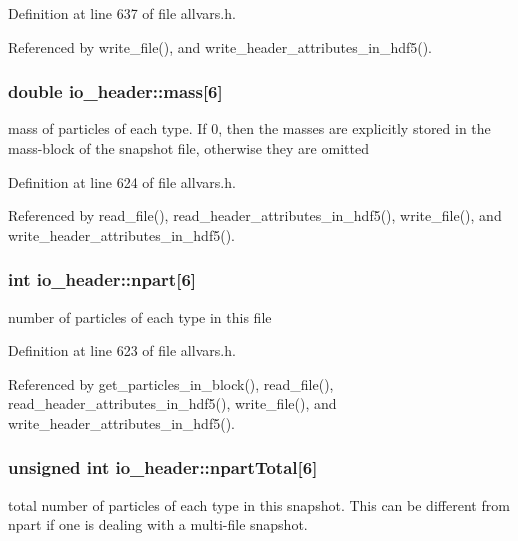 Definition at line 637 of file allvars.h.



Referenced by write\_\-file(), and write\_\-header\_\-attributes\_\-in\_\-hdf5().

\hypertarget{structio__header_a2c387b0c7c823287d424fedc70175917}{
\subsubsection[{mass}]{\setlength{\rightskip}{0pt plus 5cm}double {\bf io\_\-header::mass}\mbox{[}6\mbox{]}}}
\label{structio__header_a2c387b0c7c823287d424fedc70175917}
mass of particles of each type. If 0, then the masses are explicitly stored in the mass-\/block of the snapshot file, otherwise they are omitted 

Definition at line 624 of file allvars.h.



Referenced by read\_\-file(), read\_\-header\_\-attributes\_\-in\_\-hdf5(), write\_\-file(), and write\_\-header\_\-attributes\_\-in\_\-hdf5().

\hypertarget{structio__header_adc88d581cf3d57eb975a51f587538bdd}{
\subsubsection[{npart}]{\setlength{\rightskip}{0pt plus 5cm}int {\bf io\_\-header::npart}\mbox{[}6\mbox{]}}}
\label{structio__header_adc88d581cf3d57eb975a51f587538bdd}
number of particles of each type in this file 

Definition at line 623 of file allvars.h.



Referenced by get\_\-particles\_\-in\_\-block(), read\_\-file(), read\_\-header\_\-attributes\_\-in\_\-hdf5(), write\_\-file(), and write\_\-header\_\-attributes\_\-in\_\-hdf5().

\hypertarget{structio__header_ad63a8b413a6b56c33bf5ecc25550a6dd}{
\subsubsection[{npartTotal}]{\setlength{\rightskip}{0pt plus 5cm}unsigned int {\bf io\_\-header::npartTotal}\mbox{[}6\mbox{]}}}
\label{structio__header_ad63a8b413a6b56c33bf5ecc25550a6dd}
total number of particles of each type in this snapshot. This can be different from npart if one is dealing with a multi-\/file snapshot. 

